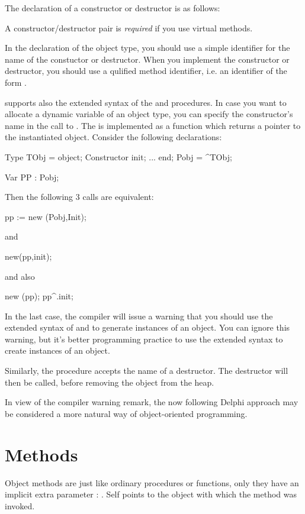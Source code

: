 \documentclass{report}
\begin{document}
The declaration of a constructor or destructor is as follows:



A constructor/destructor pair is {\em required} if you use virtual methods.

In the declaration of the object type, you should use a simple identifier
for the name of the constuctor or destructor. When you implement the
constructor or destructor, you should use a qulified method identifier,
i.e. an identifier of the form .

\fpc supports also the extended syntax of the  and 
procedures. In case you want to allocate a dynamic variable of an object
type, you can specify the constructor's name in the call to .
The  is implemented as a function which returns a pointer to the
instantiated object. Consider the following declarations:
\begin{listing}
Type
  TObj = object;
   Constructor init;
   ...
   end;
  Pobj = ^TObj;

Var PP : Pobj;
\end{listing}
Then the following 3 calls are equivalent:
\begin{listing}
 pp := new (Pobj,Init);
\end{listing}
and
\begin{listing}
  new(pp,init);
\end{listing}
and also
\begin{listing}
  new (pp);
  pp^.init;
\end{listing}
In the last case, the compiler will issue a warning that you should use the
extended syntax of  and  to generate instances of an
object. You can ignore this warning, but it's better programming practice to
use the extended syntax to create instances of an object.

Similarly, the  procedure accepts the name of a destructor. The
destructor will then be called, before removing the object from the heap.

In view of the compiler warning remark, the now following Delphi approach may 
be considered a more natural way of object-oriented programming.

\section{Methods}

Object methods are just like ordinary procedures or functions, only they
have an implicit extra parameter : . Self points to the object
with which the method was invoked.
\end{document}
